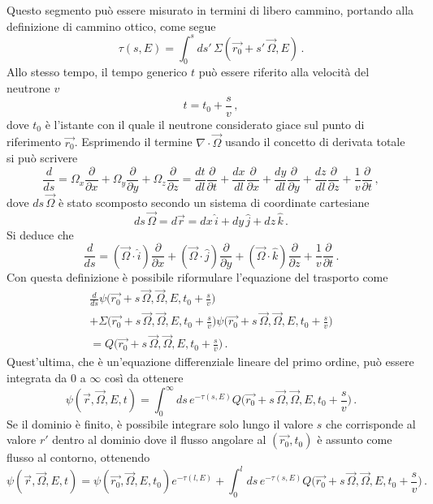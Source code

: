 Questo segmento può essere misurato in termini di libero cammino, portando alla 
definizione di cammino ottico, come segue
\begin{equation}
\label{cammino_ottico}
\tau (s,E) =\int_0^s ds'\, \Sigma(\vec{r_0}+s'\,\vec{\Omega},E) \,.
\end{equation}
Allo stesso tempo, il tempo generico $t$ può essere riferito alla velocità del 
neutrone $v$
\begin{equation}
t=t_0+\frac{s}{v} \,,
\end{equation}
dove $t_0$ è l'istante con il quale il neutrone considerato giace sul punto di 
riferimento $\vec{r_0}$.
Esprimendo il termine $\nabla\cdot\vec{\Omega}$ usando il concetto di derivata 
totale si può scrivere
\begin{equation}
\frac{d}{ds}=\Omega_x\frac{\partial}{\partial 
x}+\Omega_y\frac{\partial}{\partial y}+\Omega_z\frac{\partial}{\partial 
z}=\frac{dt}{dl}\frac{\partial}{\partial 
t}+\frac{dx}{dl}\frac{\partial}{\partial 
x}+\frac{dy}{dl}\frac{\partial}{\partial 
y}+\frac{dz}{dl}\frac{\partial}{\partial z}+\frac{1}{v}\frac{\partial}{\partial 
t} \,,
\end{equation}
dove $ds\,\vec{\Omega}$ è stato scomposto secondo un sistema di coordinate cartesiane
\begin{equation}
ds\,\vec{\Omega}=d\vec{r}=dx \, \hat{i}+dy \, \hat{j}+dz \, \hat{k} \,.
\end{equation} 
Si deduce che 
\begin{equation}
\frac{d}{ds}=(\vec{\Omega}\cdot \hat{i})\frac{\partial}{\partial 
x}+(\vec{\Omega}\cdot \hat{j})\frac{\partial}{\partial y}+(\vec{\Omega}\cdot 
\hat{k})\frac{\partial}{\partial z}+\frac{1}{v}\frac{\partial}{\partial t} \,.
\end{equation}
Con questa definizione è possibile riformulare l'equazione del trasporto come
\begin{multline}
\frac{d}{ds}\psi\biggl(\vec{r_0}+s\,\vec{\Omega},\vec{\Omega},E,t_0+\frac{s}{v}
\biggr)\\
+\Sigma\biggl(\vec{r_0}+s\,\vec{\Omega},\vec{\Omega},E,t_0+\frac{s}{v}
\biggr)\psi\biggl(\vec{r_0}+s\,\vec{\Omega},\vec{\Omega},E,t_0+\frac{s}{v}
\biggr)\\
=Q\biggl(\vec{r_0}+s\,\vec{\Omega},\vec{\Omega},E,t_0+\frac{s}{v}\biggr) \,.
\end{multline}
Quest'ultima, che è un'equazione differenziale lineare del primo ordine, può essere 
integrata da $0$ a $\infty$ così da ottenere
\begin{equation}
\psi(\vec{r},\vec{\Omega},E,t)=\int_0^\infty ds\, e^{-\tau 
(s,E)}Q\biggl(\vec{r_0}+s\,\vec{\Omega},\vec{\Omega},E,t_0+\frac{s}{v}\biggr) 
\,.
\end{equation}
Se il dominio è finito, è possibile integrare solo lungo il valore $s$ che 
corrisponde al valore $r'$ dentro al dominio dove il flusso angolare al 
$(\vec{r_0},t_0)$ è assunto come flusso al contorno, ottenendo
\begin{equation}
\psi(\vec{r},\vec{\Omega},E,t)= \psi(\vec{r_0},\vec{\Omega},E,t_0)e^{-\tau(l,E)}
+\int_0^l ds\, e^{-\tau 
(s,E)}Q\biggl(\vec{r_0}+s\,\vec{\Omega},\vec{\Omega},E,t_0+\frac{s}{v}\biggr) 
\,.
\end{equation}

